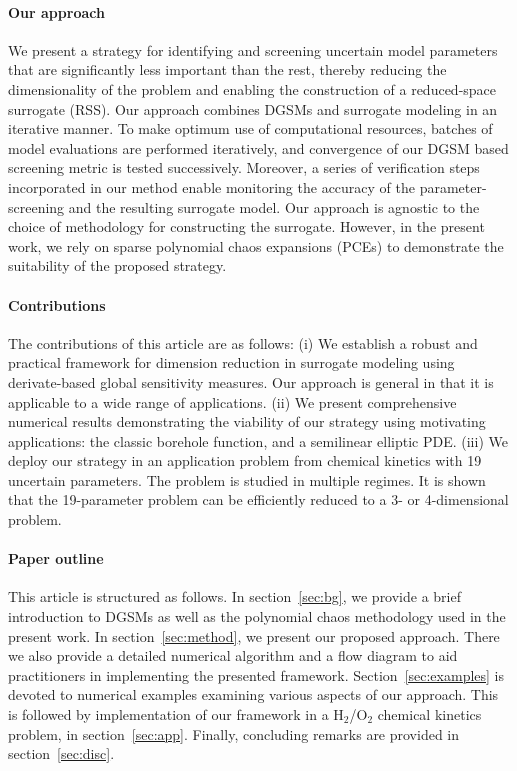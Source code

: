 \paragraph{Our approach}
We present a strategy for identifying and screening uncertain model parameters
that are significantly less important than the rest, thereby reducing the
dimensionality of the problem and enabling the construction of a reduced-space
surrogate (RSS).  Our approach combines DGSMs and surrogate modeling in an
iterative manner.  To make optimum use of computational resources, batches of
model evaluations are performed iteratively, and convergence of our DGSM based
screening metric is tested successively. Moreover, a series of verification steps
incorporated in our method enable monitoring the accuracy of the parameter-screening
and the resulting surrogate model.  Our approach is agnostic to the choice of
methodology for constructing the surrogate. However, in the present work, we
rely on sparse polynomial chaos expansions (PCEs) 
to demonstrate the suitability of the proposed strategy.  



\paragraph{Contributions}
The contributions of this article are as follows: (i) We establish a robust and
practical framework for dimension reduction in surrogate modeling using
derivate-based global sensitivity measures. Our
approach is general in that it is applicable to a wide range of applications.
(ii) We present comprehensive numerical results demonstrating the viability of
our strategy using motivating applications: the classic borehole
function, and a semilinear elliptic PDE.  (iii) We 
deploy our strategy in an application problem from chemical kinetics with 19
uncertain parameters. The problem is studied in multiple regimes.
It is shown that the 19-parameter problem can be efficiently reduced to a 3- 
or 4-dimensional problem.

\paragraph{Paper outline}
This article is structured as follows. In section~\ref{sec:bg}, we provide a
brief introduction to DGSMs as well as the polynomial chaos methodology used in
the present work.  In section~\ref{sec:method}, we present our proposed
approach. There we also provide a detailed numerical algorithm and a flow
diagram to aid practitioners in implementing the presented framework.
Section~\ref{sec:examples} is devoted to numerical examples
examining various aspects of our approach. This is followed by implementation
of our framework in a H$_2$/O$_2$ chemical kinetics problem, in section~\ref{sec:app}.
Finally, concluding remarks are provided in section~\ref{sec:disc}.


